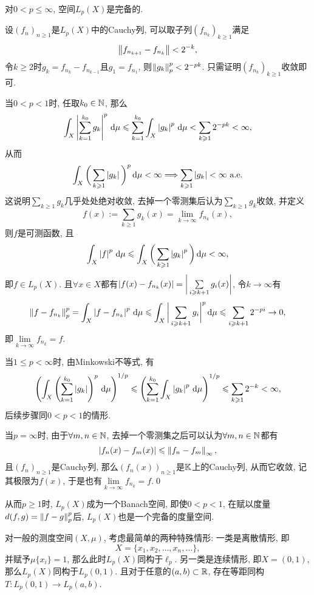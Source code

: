 	\begin{Theorem}
	对$ 0<p\leqslant\infty $, 空间$ L_p(X) $是完备的.
	\end{Theorem}
	\begin{Proof}
	设$ (f_n)_{n\geqslant 1} $是$ L_p(X) $中的Cauchy列, 可以取子列$ (f_{n_k})_{k\geqslant 1} $满足
	\[
	\left\| f_{n_{k+1}}-f_{n_k} \right\|<2^{-k},
	\]
	令$ k\geqslant 2 $时$ g_k=f_{n_k}-f_{n_{k-1}} $且$ g_1=f_{n_1} $, 则$ \left\| g_k \right\|_p^p<2^{-pk} $. 只需证明$ (f_{n_k})_{k\geqslant 1} $收敛即可.

	当$ 0<p<1 $时, 任取$ k_0\in\mathbb{N} $, 那么
	\[
	\int_X\left| \sum_{k=1}^{k_0}g_k \right| ^p\,\mathrm{d}\mu\leqslant\sum_{k=1}^{k_0}\int_X\left| g_k \right| ^p\,\mathrm{d}\mu<\sum_{k\geqslant 1}2^{-pk}<\infty,
	\]
	从而
	\[
	\int_X\bigg(\sum_{k\geqslant 1}\left| g_k \right| \bigg)^p\,\mathrm{d}\mu<\infty\Longrightarrow\sum_{k\geqslant 1}\left| g_k \right| <\infty\ \text{a.e.}
	\]
	这说明$ \sum\limits_{k\geqslant 1}g_k $几乎处处绝对收敛, 去掉一个零测集后认为$ \sum\limits_{k\geqslant 1}g_{k} $收敛, 并定义
	\[
	f(x):=\sum_{k\geqslant 1}g_k(x)=\lim_{k\to\infty}f_{n_k}(x),
	\]
	则$ f $是可测函数, 且
	\[
	\int_X\left| f \right| ^p\,\mathrm{d}\mu\leqslant\int_X\bigg(\sum_{k\geqslant 1}\left| g_k \right| ^p\bigg)\,\mathrm{d} \mu<\infty,
	\]
	即$ f\in L_p(X) $. 且$ \forall x\in X $都有$ \left| f(x)-f_{n_k}(x) \right| =\bigg|\sum\limits_{i\geqslant k+1}g_i(x)\bigg| $, 令$ k\to\infty $有
	\[
	\left\| f-f_{n_k} \right\|_p^p=\int_X\left| f-f_{n_k} \right| ^p\,\mathrm{d}\mu\leqslant\int_X\bigg|\sum_{i\geqslant k+1}g_i\bigg|^p\,\mathrm{d}\mu\leqslant\sum_{i\geqslant k+1}2^{-pi}\to 0,
	\]
	即$ \lim\limits_{k\to\infty}f_{n_{k}}=f $.

	当$ 1\leqslant p<\infty $时, 由Minkowski不等式, 有
	\[
	\left( \int_X\left( \sum_{k=1}^{k_0}\left| g_k \right|  \right)^p\,\mathrm{d}\mu \right)^{1/p}\leqslant\left( \sum_{k=1}^{k_0}\int_X\left| g_k \right| ^p\,\mathrm{d}\mu \right)^{1/p}\leqslant\sum_{k\geqslant 1}2^{-k}<\infty,
	\]
	后续步骤同$ 0<p<1 $的情形.

	当$ p=\infty $时, 由于$ \forall m,n\in\mathbb{N} $, 去掉一个零测集之后可以认为$ \forall m,n\in\mathbb{N} $都有
	\[
	\left| f_n(x)-f_m(x) \right| \leqslant\left\| f_n-f_m \right\|_\infty,
	\]
	且$ (f_n)_{n\geqslant 1} $是Cauchy列, 那么$ (f_n(x))_{n\geqslant 1} $是$ \mathbb{K} $上的Cauchy列, 从而它收敛, 记其极限为$ f(x) $, 于是也有$ \lim\limits_{k\to\infty}f_{n_k}=f $.\qed
	\end{Proof}

	从而$ p\geqslant 1 $时, $ L_p(X) $成为一个Banach空间, 即使$ 0<p<1 $, 在赋以度量$ d(f,g)=\left\| f-g \right\|_p^p $后, $ L_p(X) $也是一个完备的度量空间.

	对一般的测度空间$ (X,\mu) $, 考虑最简单的两种特殊情形: 一类是离散情形, 即
	\[
	X=\{ x_1,x_2, \dots,x_n, \dots \},
	\]
	并赋予$ \mu\{x_i\}=1 $, 那么此时$ L_p(X) $同构于$ \ell_p $. 另一类是连续情形, 即$ X=(0,1) $, 那么$ L_p(X) $同构于$ L_p(0,1) $. 且对于任意的$ (a,b)\subset\mathbb{R} $, 存在等距同构$ T : L_p(0,1)\to L_p(a,b) $.


